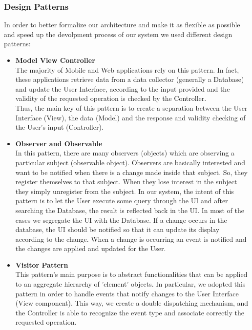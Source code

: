 \documentclass[12pt,a4paper]{article}
\begin{document}
	\subsubsection{Design Patterns}
	In order to better formalize our architecture and make it as flexible as possible and speed up the devolpment process of our system we used different design patterns:
	
	\begin{itemize}
		\item \textbf{Model View Controller}\\ 
		The majority of Mobile and Web applications rely on this pattern. In fact, these applications retrieve data from a data collector (generally a Database) and update the User Interface, according to the input provided and the validity of the requested operation is checked by the Controller.\\
		Thus, the main key of this pattern is to create a separation between the User Interface (View), the data (Model) and the response and validity checking of the User's input (Controller).
		\item \textbf{Observer and Observable}\\
		In this pattern, there are many observers (objects) which are observing a particular subject (observable object). Observers are basically interested and want to be notified when there is a change made inside that subject. So, they register themselves to that subject. When they lose interest in the subject they simply unregister from the subject. In our system, the intent of this pattern is to let the User execute some query through the UI and after searching the Database, the result is reflected back in the UI. In most of the cases we segregate the UI with the Database. If a change occurs in the database, the UI should be notified so that it can update its display according to the change. When a change is occurring an event is notified and the changes are applied and updated for the User.
		\item \textbf{Visitor Pattern}\\
		This pattern's main purpose is to abstract functionalities that can be applied to an aggregate hierarchy of 'element' objects. In particular, we adopted this pattern in order to handle events that notify changes to the User Interface (View component). This way, we create a double dispatching mechanism, and the Controller is able to recognize the event type and associate correctly the requested operation.
	\end{itemize}
	
\end{document}
